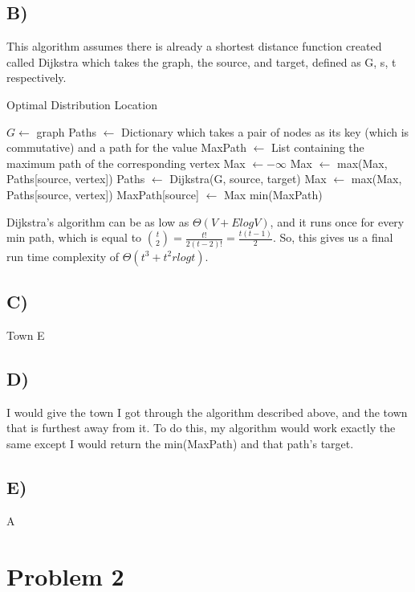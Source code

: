\documentclass[12pt, letterpaper]{article}
\begin{document}
\subsection*{B)}
This algorithm assumes there is already a shortest distance function created called Dijkstra which takes the graph, the source, and target, defined as G, s, t respectively.
\begin{algorithm}
\caption{Optimal Distribution Location}
\begin{algorithmic}
\Require $G \leftarrow$ graph
\State Paths $\leftarrow$ Dictionary which takes a pair of nodes as its key (which is commutative) and a path for the value
\State MaxPath $\leftarrow$ List containing the maximum path of the corresponding vertex
	\State Max $\leftarrow -\infty$
			\State Max $\leftarrow$ max(Max, Paths[source, vertex])
		\Else
			\State Paths $\leftarrow$ Dijkstra(G, source, target)
			\State Max $\leftarrow$ max(Max, Paths[source, vertex])
		\EndIf
	\EndFor
	\State MaxPath[source] $\leftarrow$ Max
\EndFor
\Return min(MaxPath)
\end{algorithmic}
\end{algorithm}

Dijkstra's algorithm can be as low as $\Theta(V + ElogV)$, and it runs once for every min path, which is equal to ${t \choose 2} = \frac{t!}{2(t-2)!}=\frac{t(t-1)}{2}$. So, this gives us a final run time complexity of $\Theta(t^3 + t^2rlogt)$.

\subsection*{C)}
Town E

\subsection*{D)}
I would give the town I got through the algorithm described above, and the town that is furthest away from it. To do this, my algorithm would work exactly the same except I would return the min(MaxPath) and that path's target.

\subsection*{E)}
A

\section*{Problem 2}
\end{document}
